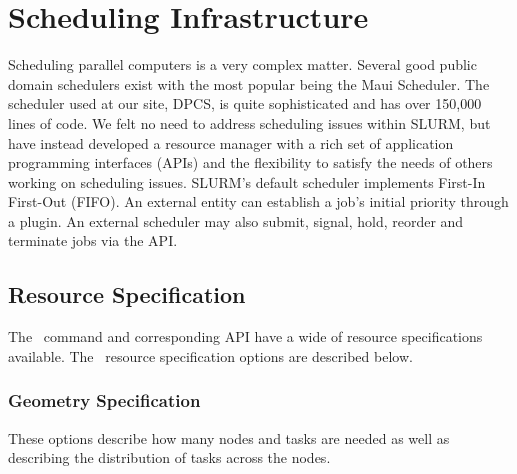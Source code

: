 \section{Scheduling Infrastructure}

Scheduling parallel computers is a very complex matter.
Several good public domain schedulers exist with the most
popular being the Maui Scheduler\cite{Jackson2001,Maui2002}.
The scheduler used at our site, DPCS\cite{DPCS2002}, is quite
sophisticated and has over 150,000 lines of code.
We felt no need to address scheduling issues within SLURM, but
have instead developed a resource manager with a rich set of
application programming interfaces (APIs) and the flexibility
to satisfy the needs of others working on scheduling issues.
SLURM's default scheduler implements First-In First-Out (FIFO).
An external entity can establish a job's initial priority
through a plugin.
An external scheduler may also submit, signal, hold, reorder and
terminate jobs via the API.

\subsection{Resource Specification}

The \srun\ command and corresponding API have a wide of resource
specifications available. The \srun\ resource specification options
are described below.

\subsubsection{Geometry Specification}

These options describe how many nodes and tasks are needed as
well as describing the distribution of tasks across the nodes.

